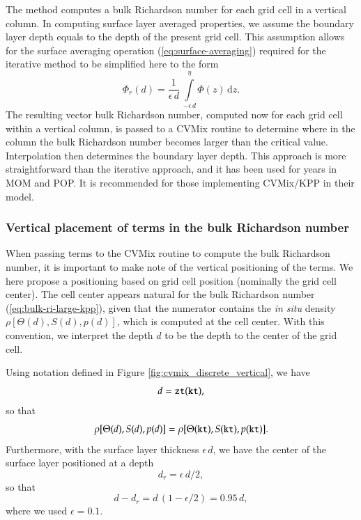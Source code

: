 The method computes a bulk Richardson number for each grid cell in a
vertical column.  In computing surface layer averaged properties, we
assume the boundary layer depth equals to the depth of the present
grid cell.  This assumption allows for the surface averaging operation
(\ref{eq:surface-averaging}) required for the iterative method to be
simplified here to the form
\begin{equation}
   \Phi_{r}(d) = \frac{1}{\epsilon \, d} \, \int\limits^{\eta}_{-\epsilon \, d} \Phi(z) \, \mathrm{d}z.
\label{eq:surface-averaging}
\end{equation}
The resulting vector bulk Richardson number, computed now for each
grid cell within a vertical column, is passed to a CVMix routine to
determine where in the column the bulk Richardson number becomes
larger than the critical value.  Interpolation then determines the
boundary layer depth.  This approach is more straightforward than the
iterative approach, and it has been used for years in MOM and POP.  It
is recommended for those implementing CVMix/KPP in their model.



\subsubsection{Vertical placement of terms in the bulk Richardson number}
\label{subsubsection:rib-terms-vertical-placement}

When passing terms to the CVMix routine to compute the bulk Richardson
number, it is important to make note of the vertical positioning of
the terms.  We here propose a positioning based on grid cell position
(nominally the grid cell center).  The cell center appears natural for
the bulk Richardson number (\ref{eq:bulk-ri-large-kpp}), given that
the numerator contains the {\it in situ} density $\rho[\Theta(d),
S(d), p(d)]$, which is computed at the cell center.  With this
convention, we interpret the depth $d$ to be the depth to the center
of the grid cell.  

Using notation defined in Figure \ref{fig:cvmix_discrete_vertical}, we
have
\begin{equation}
   d = {\tt zt(kt)},
\end{equation}
so that 
\begin{equation}
 \rho[\Theta(d), S(d), p(d)] = \rho[\Theta({\tt kt}), S({\tt kt}), p({\tt kt})].
\end{equation}
Furthermore, with the surface layer thickness $\epsilon \, d$, we have
the center of the surface layer positioned at a depth 
\begin{equation}
  d_{r} = \epsilon \, d / 2,
\end{equation}
 so that 
\begin{equation}
  d - d_r = d \, (1-\epsilon/2) = 0.95 \, d,
\end{equation}
 where we used $\epsilon = 0.1$.  

